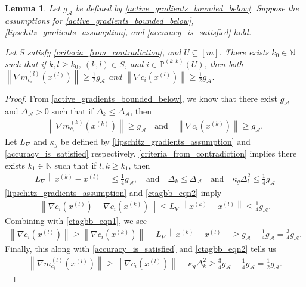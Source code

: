 \documentclass{article}
\newtheorem{lemma}[theorem]{Lemma}
\theoremstyle{case}
\numberwithin{theorem}{subsection}
\newcommand{\dk}{\Delta_k}
\newcommand{\dl}{\Delta_l}
\newcommand{\gmcik}{{\nabla m_{c_i}^{(k)}\left(\xk\right)}}
\newcommand{\gmcil}{{\nabla m_{c_i}^{(l)}\left(\xl\right)}}
\newcommand{\lipgrad}{{L_{\nabla}}}
\newcommand{\minactivegraddelta}{{\Delta_{\mathcal A}}}
\newcommand{\minactivegrad}{{ g_{\mathcal A} }}
\newcommand{\naturals}{\mathbb N}
\newcommand{\xk}{x^{(k)}}
\newcommand{\xl}{{x^{(l)}}}
\newcommand{\activeprojkk}{{\mathbb P^{(k, k)}}}
\begin{document}
\begin{lemma}
\label{close_to_active_gradients_bounded_below}
Let $\minactivegrad$ be defined by \cref{active_gradients_bounded_below}.
Suppose the assumptions for 
\cref{active_gradients_bounded_below}, 
\cref{lipschitz_gradients_assumption}, 
and \cref{accuracy_is_satisfied} hold.

Let $S$ satisfy \cref{criteria_from_contradiction}, and $U \subseteq [m]$.
There exists $k_0 \in \naturals$ such that if $k, l \ge k_0$, $(k, l) \in S$, and $i \in \activeprojkk(U)$,
then both
$\left\|\gmcil\right\| \ge \frac 1 2 \minactivegrad$
and
$\left\|\nabla c_i\left(\xl\right)\right\| \ge \frac 1 2  \minactivegrad$.
\end{lemma}
\begin{proof}
From \cref{active_gradients_bounded_below}, we know that there exist $\minactivegrad$ and $\minactivegraddelta > 0$ such that
if $\dk \le \minactivegraddelta$, then
\begin{align}
\label{ctagbb_eqn1}
\left\|\gmcik\right\| \ge \minactivegrad \quad \textrm{and} \quad
\left\|\nabla c_i\left(\xk\right)\right\| \ge \minactivegrad.
\end{align}
Let $\lipgrad$ and $\kappa_g$ be defined by \cref{lipschitz_gradients_assumption} and \cref{accuracy_is_satisfied} respectively.
\cref{criteria_from_contradiction} implies there exists $k_1 \in \naturals$ such that if $l, k \ge k_1$, then
\begin{align}
\label{ctagbb_eqn2}
\lipgrad \left\|\xk - \xl\right\| \le \frac 1 4 \minactivegrad,
\quad \textrm{and} \quad
\dk \le \minactivegraddelta
\quad \textrm{and} \quad
\kappa_g \dl^2 \le \frac 1 4 \minactivegrad
\end{align}
\cref{lipschitz_gradients_assumption} and \cref{ctagbb_eqn2} imply
\begin{align*}
\left\|\nabla c_i\left(\xl\right) - \nabla c_i\left(\xk\right)\right\| \le \lipgrad \left\|\xk - \xl\right\| \le \frac 1 4 \minactivegrad.
\end{align*}
Combining with \cref{ctagbb_eqn1}, we see
\begin{align*}
\left\|\nabla c_i\left(\xl\right)\right\| \ge \left\|\nabla c_i\left(\xk\right)\right\| - \lipgrad \left\|\xk - \xl\right\|
\ge \minactivegrad - \frac 1 4 \minactivegrad = \frac 3 4 \minactivegrad.
\end{align*}
Finally, this along with \cref{accuracy_is_satisfied} and \cref{ctagbb_eqn2} tells us
\begin{align*}
\left\|\gmcil\right\| \ge \left\|\nabla c_i\left(\xl\right)\right\| - \kappa_g \dk^2 \ge \frac 3 4 \minactivegrad - \frac 1 4 \minactivegrad = \frac 1 2 \minactivegrad.
\end{align*}
\end{proof}
\end{document}
